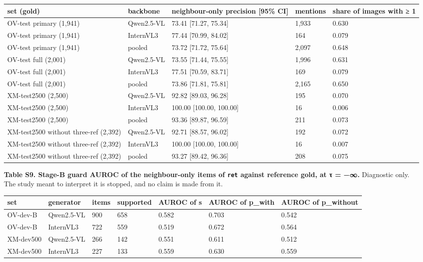 \documentclass[manuscript,screen]{acmart}
\begin{document}
\begin{longtable}[]{@{}lllll@{}}
\toprule\noalign{}
set (gold) & backbone & neighbour-only precision {[}95\% CI{]} & mentions & share of images with ≥
1 \\
\midrule\noalign{}
\endhead
\bottomrule\noalign{}
\endlastfoot
OV-test primary (1,941) & Qwen2.5-VL & 73.41 {[}71.27, 75.34{]} & 1,933 & 0.630 \\
OV-test primary (1,941) & InternVL3 & 77.44 {[}70.99, 84.02{]} & 164 & 0.079 \\
OV-test primary (1,941) & pooled & 73.72 {[}71.72, 75.64{]} & 2,097 & 0.648 \\
OV-test full (2,001) & Qwen2.5-VL & 73.55 {[}71.44, 75.55{]} & 1,996 & 0.631 \\
OV-test full (2,001) & InternVL3 & 77.51 {[}70.59, 83.71{]} & 169 & 0.079 \\
OV-test full (2,001) & pooled & 73.86 {[}71.81, 75.81{]} & 2,165 & 0.650 \\
XM-test2500 (2,500) & Qwen2.5-VL & 92.82 {[}89.03, 96.28{]} & 195 & 0.070 \\
XM-test2500 (2,500) & InternVL3 & 100.00 {[}100.00, 100.00{]} & 16 & 0.006 \\
XM-test2500 (2,500) & pooled & 93.36 {[}89.87, 96.59{]} & 211 & 0.073 \\
XM-test2500 without three-ref (2,392) & Qwen2.5-VL & 92.71 {[}88.57, 96.02{]} & 192 & 0.072 \\
XM-test2500 without three-ref (2,392) & InternVL3 & 100.00 {[}100.00, 100.00{]} & 16 & 0.007 \\
XM-test2500 without three-ref (2,392) & pooled & 93.27 {[}89.42, 96.36{]} & 208 & 0.075 \\
\end{longtable}

\textbf{Table S9. Stage-B guard AUROC of the neighbour-only items of \texttt{ret} against reference
gold, at τ = −∞.} Diagnostic only. The study meant to interpret it is stopped, and no claim is made
from it.

\begin{longtable}[]{@{}lllllll@{}}
\toprule\noalign{}
set & generator & items & supported & AUROC of s & AUROC of p\_with & AUROC of p\_without \\
\midrule\noalign{}
\endhead
\bottomrule\noalign{}
\endlastfoot
OV-dev-B & Qwen2.5-VL & 900 & 658 & 0.582 & 0.703 & 0.542 \\
OV-dev-B & InternVL3 & 722 & 559 & 0.519 & 0.672 & 0.564 \\
XM-dev500 & Qwen2.5-VL & 266 & 142 & 0.551 & 0.611 & 0.512 \\
XM-dev500 & InternVL3 & 227 & 133 & 0.559 & 0.630 & 0.559 \\
\end{longtable}
\end{document}
